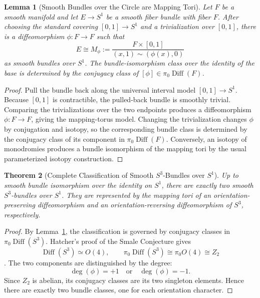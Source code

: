 \documentclass[11pt]{article}
\theoremstyle{canonmath}
\newtheorem{theorem}{Theorem}[section]
\newtheorem{lemma}[theorem]{Lemma}
\theoremstyle{canonpostulate}
\theoremstyle{canonproposition}
\providecommand{\Ztwo}{\mathbb{Z}_2}
\providecommand{\Sone}{S^1}
\providecommand{\Sthree}{S^3}
\providecommand{\Diff}{\operatorname{Diff}}
\providecommand{\degfn}{\operatorname{deg}}
\def\mathbb#1{#1}%
\begin{document}
\begin{lemma}[Smooth Bundles over the Circle are Mapping Tori] \label{lem:mappingtorus}
Let $F$ be a smooth manifold and let $E\to\Sone$ be a smooth fiber bundle with fiber $F$. After choosing the standard covering $[0,1]\to\Sone$ and a trivialization over $[0,1]$, there is a diffeomorphism $\phi:F\to F$ such that
\[
E\cong M_\phi:=\frac{F\times[0,1]}{(x,1)\sim(\phi(x),0)}
\]
as smooth bundles over $\Sone$. The bundle-isomorphism class over the identity of the base is determined by the conjugacy class of $[\phi]\in\pi_0\Diff(F)$.
\end{lemma}
\begin{proof}
Pull the bundle back along the universal interval model $[0,1]\to\Sone$. Because $[0,1]$ is contractible, the pulled-back bundle is smoothly trivial. Comparing the trivializations over the two endpoints produces a diffeomorphism $\phi:F\to F$, giving the mapping-torus model. Changing the trivialization changes $\phi$ by conjugation and isotopy, so the corresponding bundle class is determined by the conjugacy class of its component in $\pi_0\Diff(F)$. Conversely, an isotopy of monodromies produces a bundle isomorphism of the mapping tori by the usual parameterized isotopy construction.
\end{proof}

\begin{theorem}[Complete Classification of Smooth $\Sthree$-Bundles over $\Sone$] \label{thm:complete_bundle}
Up to smooth bundle isomorphism over the identity on $\Sone$, there are exactly two smooth $\Sthree$-bundles over $\Sone$. They are represented by the mapping tori of an orientation-preserving diffeomorphism and an orientation-reversing diffeomorphism of $\Sthree$, respectively.
\end{theorem}
\begin{proof}
By Lemma~\ref{lem:mappingtorus}, the classification is governed by conjugacy classes in $\pi_0\Diff(\Sthree)$. Hatcher's proof of the Smale Conjecture gives
\[
\Diff(\Sthree)\simeq O(4),
\qquad
\pi_0\Diff(\Sthree)\cong\pi_0O(4)\cong\Ztwo
\]
\cite{hatcher}. The two components are distinguished by the degree:
\[
\degfn(\phi)=+1
\quad\text{or}\quad
\degfn(\phi)=-1.
\]
Since $\Ztwo$ is abelian, its conjugacy classes are its two singleton elements. Hence there are exactly two bundle classes, one for each orientation character.
\end{proof}
\end{document}
